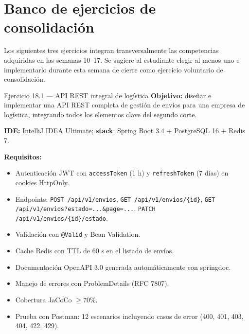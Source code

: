 \documentclass[11pt,a4paper,openany]{book}
\begin{document}
\section{Banco de ejercicios de consolidación}

Los siguientes tres ejercicios integran transversalmente las
competencias adquiridas en las semanas 10--17. Se sugiere al
estudiante elegir al menos uno e implementarlo durante esta semana
de cierre como ejercicio voluntario de consolidación.

\begin{cajaejercicio}{Ejercicio 18.1 --- API REST integral de logística}
\textbf{Objetivo:} diseñar e implementar una API REST completa de
gestión de envíos para una empresa de logística, integrando todos los
elementos clave del segundo corte.

\textbf{IDE:} IntelliJ IDEA Ultimate; \textbf{stack}: Spring Boot 3.4
+ PostgreSQL 16 + Redis 7.

\textbf{Requisitos:}
\begin{itemize}
\item Autenticación JWT con \texttt{accessToken} (1 h) y
\texttt{refreshToken} (7 días) en cookies HttpOnly.
\item Endpoints: \texttt{POST /api/v1/envios},
\texttt{GET /api/v1/envios/\{id\}},
\texttt{GET /api/v1/envios?estado=...\&page=...},
\texttt{PATCH /api/v1/envios/\{id\}/estado}.
\item Validación con \texttt{@Valid} y Bean Validation.
\item Cache Redis con TTL de 60 s en el listado de envíos.
\item Documentación OpenAPI 3.0 generada automáticamente con
springdoc.
\item Manejo de errores con ProblemDetails (RFC 7807).
\item Cobertura JaCoCo $\geq 70\%$.
\item Prueba con Postman: 12 escenarios incluyendo casos de error
(400, 401, 403, 404, 422, 429).
\end{itemize}
\end{cajaejercicio}
\end{document}
